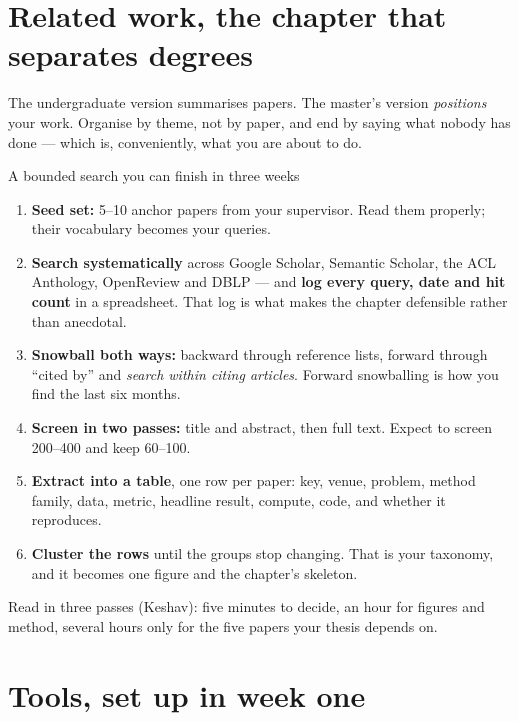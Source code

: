 \documentclass[11pt,a4paper]{article}
\begin{document}
\section{Related work, the chapter that separates degrees}

The undergraduate version summarises papers. The master's version
\emph{positions} your work. Organise by theme, not by paper, and end by saying
what nobody has done --- which is, conveniently, what you are about to do.

\begin{cbox}{A bounded search you can finish in three weeks}
\begin{enumerate}
  \item \textbf{Seed set:} 5--10 anchor papers from your supervisor. Read them
        properly; their vocabulary becomes your queries.
  \item \textbf{Search systematically} across Google Scholar, Semantic
        Scholar, the ACL Anthology, OpenReview and DBLP --- and
        \textbf{log every query, date and hit count} in a spreadsheet. That
        log is what makes the chapter defensible rather than anecdotal.
  \item \textbf{Snowball both ways:} backward through reference lists,
        forward through ``cited by'' and \emph{search within citing articles}.
        Forward snowballing is how you find the last six months.
  \item \textbf{Screen in two passes:} title and abstract, then full text.
        Expect to screen 200--400 and keep 60--100.
  \item \textbf{Extract into a table}, one row per paper: key, venue, problem,
        method family, data, metric, headline result, compute, code, and
        whether it reproduces.
  \item \textbf{Cluster the rows} until the groups stop changing. That is your
        taxonomy, and it becomes one figure and the chapter's skeleton.
\end{enumerate}
\end{cbox}

Read in three passes (Keshav): five minutes to decide, an hour for figures and
method, several hours only for the five papers your thesis depends on.

\section{Tools, set up in week one}
\label{sec:tools}
\end{document}
